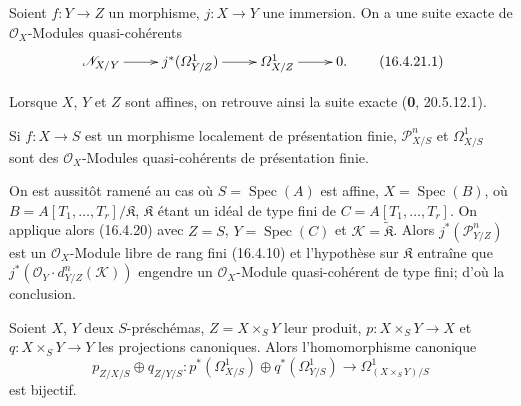 \begin{corollary}[16.4.21]
\label{IV.16.4.21}
Soient $f:Y\to Z$ un morphisme, $j:X\to Y$ une immersion. On a une suite
exacte de $\mathcal{O}_X$-Modules quasi-cohérents
\[
  \xymatrix{
    \mathscr{N}_{X/Y}\ar[r]&j^*(\varOmega_{Y/Z}^1)\ar[r]&
    \varOmega_{X/Z}^1\ar[r]&0.
  }
  \tag{16.4.21.1}
  \label{IV.16.4.21.1}
\]
\end{corollary}

Lorsque $X$, $Y$ et $Z$ sont affines, on retrouve ainsi la suite exacte
(\textbf{0}, 20.5.12.1).

\begin{corollary}[16.4.22]
\label{IV.16.4.22}
Si $f:X\to S$ est un morphisme localement de présentation finie,
$\mathscr{P}_{X/S}^n$ et $\varOmega_{X/S}^1$ sont des
$\mathcal{O}_X$-Modules quasi-cohérents de présentation finie.
\end{corollary}

On est aussitôt ramené au cas où $S=\operatorname{Spec}(A)$ est affine,
$X=\operatorname{Spec}(B)$, où
$B=A[T_1,\ldots,T_r]/\mathfrak{K}$, $\mathfrak{K}$ étant un idéal de type
fini de $C=A[T_1,\ldots,T_r]$. On applique alors (16.4.20) avec $Z=S$,
$Y=\operatorname{Spec}(C)$ et $\mathscr{K}=\widetilde{\mathfrak{K}}$. Alors
$j^*(\mathscr{P}_{Y/Z}^n)$ est un $\mathcal{O}_X$-Module libre de rang fini
(16.4.10) et l'hypothèse sur $\mathfrak{K}$ entraîne que
$j^*(\mathcal{O}_Y\cdot d_{Y/Z}^n(\mathscr{K}))$ engendre un
$\mathcal{O}_X$-Module quasi-cohérent de type fini; d'où la conclusion.

\begin{proposition}[16.4.23]
\label{IV.16.4.23}
Soient $X$, $Y$ deux $S$-préschémas, $Z=X\times_S Y$ leur produit,
$p:X\times_S Y\to X$ et $q:X\times_S Y\to Y$ les projections canoniques.
Alors l'homomorphisme canonique
\[
  p_{Z/X/S}\oplus q_{Z/Y/S}:
  p^*(\varOmega_{X/S}^1)\oplus q^*(\varOmega_{Y/S}^1)
  \longrightarrow\varOmega_{(X\times_S Y)/S}^1
  \tag{16.4.23.1}
  \label{IV.16.4.23.1}
\]
est bijectif.
\end{proposition}

